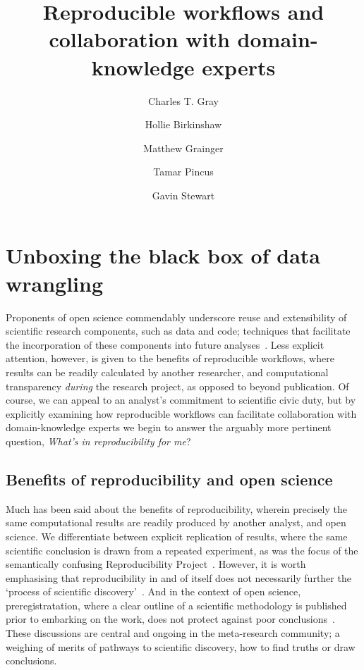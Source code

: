 \documentclass{article}
\title{Reproducible workflows and collaboration with domain-knowledge experts}
\author[1]{Charles T. Gray}
\author[2]{Hollie Birkinshaw}
\author[3]{Matthew Grainger}
\author[2]{Tamar Pincus}
\author[1]{Gavin Stewart}
\affil[1]{Newcastle University}
\affil[2]{Royal Holloway}
\affil[3]{NINA}
\begin{document}


\maketitle

\section{Unboxing the black box of data wrangling}


Proponents of open science commendably underscore reuse and extensibility of 
scientific research components, such as data and code; techniques that facilitate the incorporation of these components into future analyses~\cite{laine_2018, peng_reproducible_2011-1, wilkinson_2016}. Less explicit attention, however, is given to the benefits of reproducible workflows, where results can be readily calculated by another researcher, and computational transparency \emph{during} the research project, as opposed to beyond publication. Of course, we can appeal to an analyst's commitment to scientific civic duty, but by explicitly examining how reproducible workflows can facilitate collaboration with domain-knowledge experts we begin to answer the arguably more pertinent question, \emph{What's in reproducibility for me}?      

\subsection{Benefits of reproducibility and open science}

Much has been said about the benefits of reproducibility, wherein precisely the same computational results are readily produced by another analyst, and open science. We differentiate between explicit replication of results, where the same scientific conclusion is drawn from a repeated experiment, as was the focus of the  semantically confusing Reproducibility Project~\cite{collaboration_2015}.  However, it is worth emphasising that reproducibility in and of itself does not necessarily further the `process of scientific discovery'~\cite{devezer_2019}. And in the context of open science, preregistratation, where a clear outline of a scientific methodology is published prior to embarking on the work, does not protect against poor conclusions~\cite{szollosi_2019b}. These discussions are central and ongoing in the meta-research community; a weighing of merits of pathways to scientific discovery, how to find truths or draw conclusions.
\end{document}
